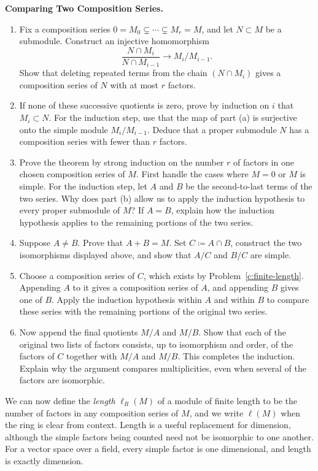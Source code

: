 \documentclass[12pt,reqno]{amsart}
\begin{document}
\begin{problems}
\item\label{c:jordan-holder} \textbf{Comparing Two Composition Series.}
\begin{enumerate}
\item Fix a composition series $0=M_0\subsetneq\cdots\subsetneq M_r=M$, and let $N\subset M$ be a submodule. Construct an injective homomorphism
\[
\frac{N\cap M_i}{N\cap M_{i-1}}\longrightarrow M_i/M_{i-1}.
\]
Show that deleting repeated terms from the chain $(N\cap M_i)$ gives a composition series of $N$ with at most $r$ factors.
\item If none of these successive quotients is zero, prove by induction on $i$ that $M_i\subset N$. For the induction step, use that the map of part (a) is surjective onto the simple module $M_i/M_{i-1}$. Deduce that a proper submodule $N$ has a composition series with fewer than $r$ factors.
\item Prove the theorem by strong induction on the number $r$ of factors in one chosen composition series of $M$. First handle the cases where $M=0$ or $M$ is simple. For the induction step, let $A$ and $B$ be the second-to-last terms of the two series. Why does part (b) allow us to apply the induction hypothesis to every proper submodule of $M$? If $A=B$, explain how the induction hypothesis applies to the remaining portions of the two series.
\item Suppose $A\ne B$. Prove that $A+B=M$. Set $C\coloneqq A\cap B$, construct the two isomorphisms displayed above, and show that $A/C$ and $B/C$ are simple.
\item Choose a composition series of $C$, which exists by Problem~\ref{c:finite-length}. Appending $A$ to it gives a composition series of $A$, and appending $B$ gives one of $B$. Apply the induction hypothesis within $A$ and within $B$ to compare these series with the remaining portions of the original two series.
\item Now append the final quotients $M/A$ and $M/B$. Show that each of the original two lists of factors consists, up to isomorphism and order, of the factors of $C$ together with $M/A$ and $M/B$. This completes the induction. Explain why the argument compares multiplicities, even when several of the factors are isomorphic.
\end{enumerate}
\end{problems}

\hrulefill

We can now define the \emph{length} $\ell_R(M)$ of a module of finite length to be the number of factors in any composition series of $M$, and we write $\ell(M)$ when the ring is clear from context. Length is a useful replacement for dimension, although the simple factors being counted need not be isomorphic to one another. For a vector space over a field, every simple factor is one dimensional, and length is exactly dimension.
\end{document}
